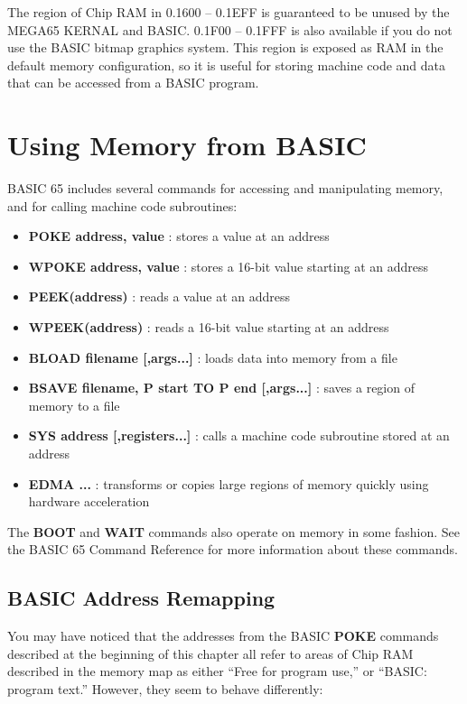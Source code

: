 The region of Chip RAM in 0.1600 -- 0.1EFF is guaranteed to be unused by the MEGA65 KERNAL and BASIC. 0.1F00 -- 0.1FFF is also available if you do not use the BASIC bitmap graphics system. This region is exposed as RAM in the default memory configuration, so it is useful for storing machine code and data that can be accessed from a BASIC program.


\newpage
\section{Using Memory from BASIC}

BASIC 65 includes several commands for accessing and manipulating memory, and for calling machine code subroutines:

\begin{itemize}
\item {\bf POKE address, value} : stores a value at an address
\item {\bf WPOKE address, value} : stores a 16-bit value starting at an address
\item {\bf PEEK(address)} : reads a value at an address
\item {\bf WPEEK(address)} : reads a 16-bit value starting at an address
\item {\bf BLOAD filename [,args...]} : loads data into memory from a file
\item {\bf BSAVE filename, P start TO P end [,args...]} : saves a region of memory to a file
\item {\bf SYS address [,registers...]} : calls a machine code subroutine stored at an address
\item {\bf EDMA ...} : transforms or copies large regions of memory quickly using hardware acceleration
\end{itemize}

The {\bf BOOT} and {\bf WAIT} commands also operate on memory in some fashion. See the BASIC 65 Command Reference for more information about these commands.

\subsection{BASIC Address Remapping}

You may have noticed that the addresses from the BASIC {\bf POKE} commands described at the beginning of this chapter all refer to areas of Chip RAM described in the memory map as either ``Free for program use,'' or ``BASIC: program text.'' However, they seem to behave differently:

